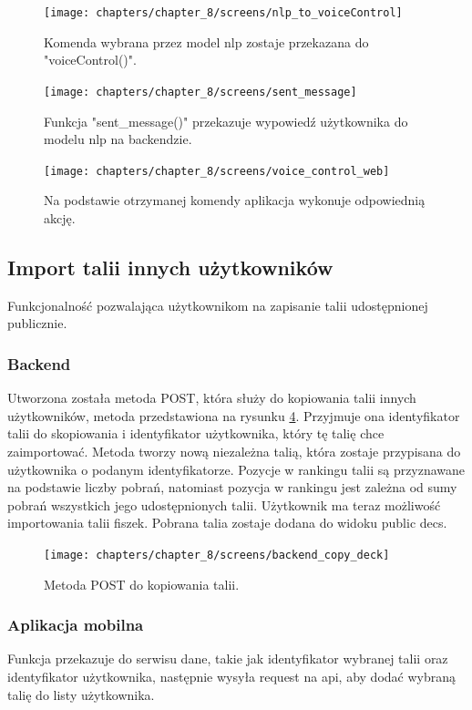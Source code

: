\begin{figure}[H]
    \centering
    \texttt{[image: chapters/chapter\_8/screens/nlp\_to\_voiceControl]}
    \caption{Komenda wybrana przez model nlp zostaje przekazana do "voiceControl()".}
    \label{img:nlp_to_voiceControl}
\end{figure}

\begin{figure}[H]
    \centering
    \texttt{[image: chapters/chapter\_8/screens/sent\_message]}
    \caption{Funkcja "sent\_message()" przekazuje wypowiedź użytkownika do modelu nlp na backendzie.}
    \label{img:sent_message}
\end{figure}

\begin{figure}[H]
    \centering
    \texttt{[image: chapters/chapter\_8/screens/voice\_control\_web]}
    \caption{Na podstawie otrzymanej komendy aplikacja wykonuje odpowiednią akcję.}
    \label{img:voice_control_web}
\end{figure}

\subsection{Import talii innych użytkowników}
Funkcjonalność pozwalająca użytkownikom na zapisanie talii udostępnionej publicznie.

\subsubsection{Backend}
Utworzona została metoda POST, która służy do kopiowania talii innych użytkowników, metoda przedstawiona na rysunku \ref{img:backend_copy_deck}. Przyjmuje ona identyfikator talii do skopiowania i identyfikator użytkownika, który tę talię chce zaimportować. Metoda tworzy nową niezależna talią, która zostaje przypisana do użytkownika o podanym identyfikatorze. Pozycje w rankingu talii są przyznawane na podstawie liczby pobrań, natomiast pozycja w rankingu jest zależna od sumy pobrań wszystkich jego udostępnionych talii. Użytkownik ma teraz możliwość importowania talii fiszek. Pobrana talia zostaje dodana do widoku public decs.

\begin{figure}[H]
    \centering
    \texttt{[image: chapters/chapter\_8/screens/backend\_copy\_deck]}
    \caption{Metoda POST do kopiowania talii.}
    \label{img:backend_copy_deck}
\end{figure}

\subsubsection{Aplikacja mobilna}
Funkcja przekazuje do serwisu dane, takie jak identyfikator wybranej talii oraz identyfikator użytkownika, następnie wysyła request na api, aby dodać wybraną talię do listy użytkownika.

